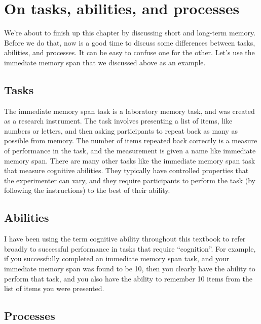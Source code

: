 \documentclass[
  oneside,
  12pt]{crumpbook}
\begin{document}
\hypertarget{on-tasks-abilities-and-processes}{%
\section{On tasks, abilities, and processes}\label{on-tasks-abilities-and-processes}}

We're about to finish up this chapter by discussing short and long-term memory. Before we do that, now is a good time to discuss some differences between tasks, abilities, and processes. It can be easy to confuse one for the other. Let's use the immediate memory span that we discussed above as an example.

\hypertarget{tasks}{%
\subsection{Tasks}\label{tasks}}

The immediate memory span task is a laboratory memory task, and was created as a research instrument. The task involves presenting a list of items, like numbers or letters, and then asking participants to repeat back as many as possible from memory. The number of items repeated back correctly is a measure of performance in the task, and the measurement is given a name like immediate memory span. There are many other tasks like the immediate memory span task that measure cognitive abilities. They typically have controlled properties that the experimenter can vary, and they require participants to perform the task (by following the instructions) to the best of their ability.

\hypertarget{abilities}{%
\subsection{Abilities}\label{abilities}}

I have been using the term cognitive ability throughout this textbook to refer broadly to successful performance in tasks that require ``cognition''. For example, if you successfully completed an immediate memory span task, and your immediate memory span was found to be 10, then you clearly have the ability to perform that task, and you also have the ability to remember 10 items from the list of items you were presented.

\hypertarget{processes}{%
\subsection{Processes}\label{processes}}
\end{document}
